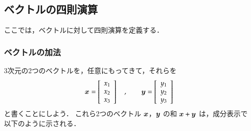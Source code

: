             \subsection{ベクトルの四則演算}
            \begin{mycomment}
                ここでは，ベクトルに対して四則演算を定義する．
            \end{mycomment}

            \subsubsection{ベクトルの加法}
            3次元の2つのベクトルを，任意にもってきて，それらを
            \begin{equation*}
                \boldsymbol{x} =
                \left[
                    \begin{array}{c}
                        x_{1} \\
                        x_{2} \\
                        x_{3} \\
                   \end{array}
                \right]\quad , \qquad
                \boldsymbol{y} =
                \left[
                    \begin{array}{c}
                        y_{1} \\
                        y_{2} \\
                        y_{3} \\
                   \end{array}
                \right]
            \end{equation*}
            と書くことにしよう．
            これら2つのベクトル $\boldsymbol{x}$，$\boldsymbol{y}$ の和 $\boldsymbol{x} + \boldsymbol{y}$ は，成分表示で
            以下のように示される．
